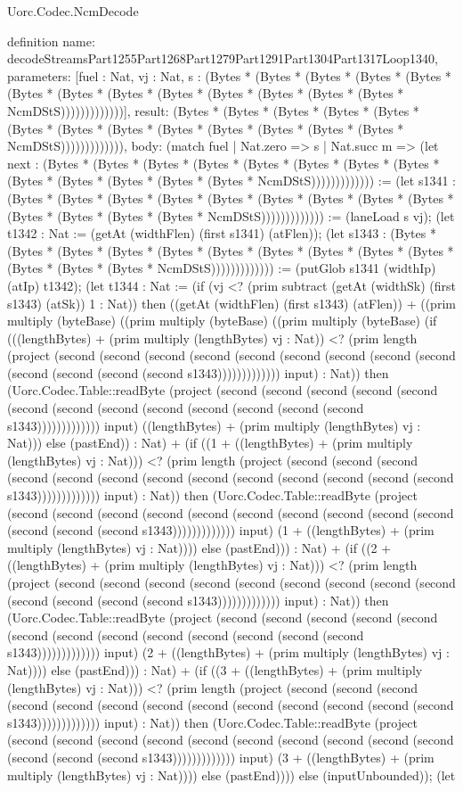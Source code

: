 \begin{lexlean}{Uorc.Codec.NcmDecode}
\begin{semanticmodule}
definition{
  name: decodeStreamsPart1255Part1268Part1279Part1291Part1304Part1317Loop1340,
  parameters: [fuel : Nat, vj : Nat, s : (Bytes * (Bytes * (Bytes * (Bytes * (Bytes * (Bytes * (Bytes * (Bytes * (Bytes * (Bytes * (Bytes * (Bytes * (Bytes * NcmDStS)))))))))))))],
  result: (Bytes * (Bytes * (Bytes * (Bytes * (Bytes * (Bytes * (Bytes * (Bytes * (Bytes * (Bytes * (Bytes * (Bytes * (Bytes * NcmDStS))))))))))))),
  body: (match fuel
    | Nat.zero => s
    | Nat.succ m => (let next : (Bytes * (Bytes * (Bytes * (Bytes * (Bytes * (Bytes * (Bytes * (Bytes * (Bytes * (Bytes * (Bytes * (Bytes * (Bytes * NcmDStS))))))))))))) := (let s1341 : (Bytes * (Bytes * (Bytes * (Bytes * (Bytes * (Bytes * (Bytes * (Bytes * (Bytes * (Bytes * (Bytes * (Bytes * (Bytes * NcmDStS))))))))))))) := (laneLoad s vj); (let t1342 : Nat := (getAt (widthFlen) (first s1341) (atFlen)); (let s1343 : (Bytes * (Bytes * (Bytes * (Bytes * (Bytes * (Bytes * (Bytes * (Bytes * (Bytes * (Bytes * (Bytes * (Bytes * (Bytes * NcmDStS))))))))))))) := (putGlob s1341 (widthIp) (atIp) t1342); (let t1344 : Nat := (if (vj <? (prim subtract (getAt (widthSk) (first s1343) (atSk)) 1 : Nat)) then ((getAt (widthFlen) (first s1343) (atFlen)) + ((prim multiply (byteBase) ((prim multiply (byteBase) ((prim multiply (byteBase) (if (((lengthBytes) + (prim multiply (lengthBytes) vj : Nat)) <? (prim length (project (second (second (second (second (second (second (second (second (second (second (second (second (second s1343))))))))))))) input) : Nat)) then (Uorc.Codec.Table::readByte (project (second (second (second (second (second (second (second (second (second (second (second (second (second s1343))))))))))))) input) ((lengthBytes) + (prim multiply (lengthBytes) vj : Nat))) else (pastEnd)) : Nat) + (if ((1 + ((lengthBytes) + (prim multiply (lengthBytes) vj : Nat))) <? (prim length (project (second (second (second (second (second (second (second (second (second (second (second (second (second s1343))))))))))))) input) : Nat)) then (Uorc.Codec.Table::readByte (project (second (second (second (second (second (second (second (second (second (second (second (second (second s1343))))))))))))) input) (1 + ((lengthBytes) + (prim multiply (lengthBytes) vj : Nat)))) else (pastEnd))) : Nat) + (if ((2 + ((lengthBytes) + (prim multiply (lengthBytes) vj : Nat))) <? (prim length (project (second (second (second (second (second (second (second (second (second (second (second (second (second s1343))))))))))))) input) : Nat)) then (Uorc.Codec.Table::readByte (project (second (second (second (second (second (second (second (second (second (second (second (second (second s1343))))))))))))) input) (2 + ((lengthBytes) + (prim multiply (lengthBytes) vj : Nat)))) else (pastEnd))) : Nat) + (if ((3 + ((lengthBytes) + (prim multiply (lengthBytes) vj : Nat))) <? (prim length (project (second (second (second (second (second (second (second (second (second (second (second (second (second s1343))))))))))))) input) : Nat)) then (Uorc.Codec.Table::readByte (project (second (second (second (second (second (second (second (second (second (second (second (second (second s1343))))))))))))) input) (3 + ((lengthBytes) + (prim multiply (lengthBytes) vj : Nat)))) else (pastEnd)))) else (inputUnbounded)); (let }
\end{semanticmodule}
\end{lexlean}
